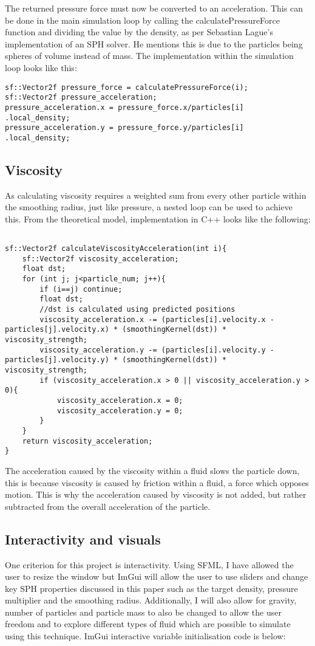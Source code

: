 \documentclass[write-up.tex]{subfiles}
\begin{document}
The returned pressure force must now be converted to an acceleration. This can be done in the main simulation loop by calling the calculatePressureForce function and dividing the value by the density, as per Sebastian Lague's implementation \cite{Lague} of an SPH solver. He mentions this is due to the particles being spheres of volume instead of mass. The implementation within the simulation loop looks like this:

\begin{lstlisting}
sf::Vector2f pressure_force = calculatePressureForce(i);
sf::Vector2f pressure_acceleration;
pressure_acceleration.x = pressure_force.x/particles[i]
.local_density;
pressure_acceleration.y = pressure_force.y/particles[i]
.local_density;
\end{lstlisting}
\subsection{Viscosity}
As calculating viscosity requires a weighted sum from every other particle within the smoothing radius, just like pressure, a nested loop can be used to achieve this. From the theoretical model, implementation in C++ looks like the following:
\begin{lstlisting}

sf::Vector2f calculateViscosityAcceleration(int i){
    sf::Vector2f viscosity_acceleration;
    float dst;
    for (int j; j<particle_num; j++){
        if (i==j) continue;
        float dst;
        //dst is calculated using predicted positions
        viscosity_acceleration.x -= (particles[i].velocity.x - particles[j].velocity.x) * (smoothingKernel(dst)) * viscosity_strength;
        viscosity_acceleration.y -= (particles[i].velocity.y - particles[j].velocity.y) * (smoothingKernel(dst)) * viscosity_strength;
        if (viscosity_acceleration.x > 0 || viscosity_acceleration.y > 0){
            viscosity_acceleration.x = 0;
            viscosity_acceleration.y = 0;
        }
    }
    return viscosity_acceleration;
}

\end{lstlisting}

The acceleration caused by the viscosity within a fluid slows the particle down, this is because viscosity is caused by friction within a fluid, a force which opposes motion. This is why the acceleration caused by viscosity is not added, but rather subtracted from the overall acceleration of the particle.
\subsection{Interactivity and visuals}
One criterion for this project is interactivity. Using SFML, I have allowed the user to resize the window but ImGui will allow the user to use sliders and change key SPH properties discussed in this paper such as the target density, pressure multiplier and the smoothing radius. Additionally, I will also allow for gravity, number of particles and particle mass to also be changed to allow the user freedom and to explore different types of fluid which are possible to simulate using this technique. ImGui interactive variable initialisation code is below:
\end{document}
